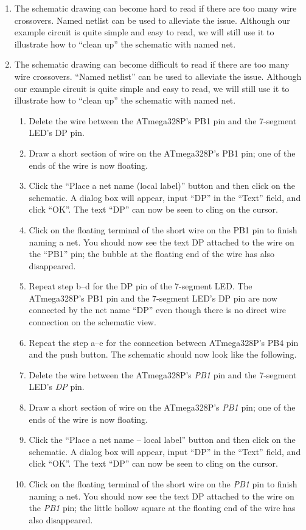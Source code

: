\documentclass[12pt,letterpaper]{scrartcl}
\begin{document}
\begin{enumerate}
	\item The schematic drawing can become hard to read if there are too many wire crossovers. Named netlist can be used to alleviate the issue. Although our example circuit is quite simple and easy to read, we will still use it to illustrate how to “clean up” the schematic with named net.
	\item The schematic drawing can become difficult to read if there are too many wire crossovers. ``Named netlist'' can be used to alleviate the issue. Although our example circuit is quite simple and easy to read, we will still use it to illustrate how to ``clean up'' the schematic with named net.
		\begin{enumerate}
			\item Delete the wire between the ATmega328P’s PB1 pin and the 7-segment LED’s DP pin.
			\item Draw a short section of wire on the ATmega328P’s PB1 pin; one of the ends of the wire is now floating. 
			\item Click the ``Place a net name (local label)'' button and then click on the schematic. A dialog box will appear, input ``DP'' in the ``Text'' field, and click ``OK''. The text ``DP'' can now be seen to cling on the cursor. 
			\item Click on the floating terminal of the short wire on the PB1 pin to finish naming a net. You should now see the text DP attached to the wire on the ``PB1'' pin; the bubble at the floating end of the wire has also disappeared. 
			\item Repeat step b--d for the DP pin of the 7-segment LED. 
			The ATmega328P’s PB1 pin and the 7-segment LED’s DP pin are now connected by the net name ``DP'' even though there is no direct wire connection on the schematic view. 
			\item Repeat the step a--e for the connection between ATmega328P’s PB4 pin and the push button. The schematic should now look like the following.  
			\item Delete the wire between the ATmega328P's \emph{PB1} pin and the 7-segment LED's \emph{DP} pin. 
			\item Draw a short section of wire on the ATmega328P's \emph{PB1} pin; one of the ends of the wire is now floating. 
			\item Click the ``Place a net name -- local label'' button and then click on the schematic. A dialog box will appear, input ``DP'' in the ``Text'' field, and click ``OK''. The text ``DP'' can now be seen to cling on the cursor. 
			\item Click on the floating terminal of the short wire on the \emph{PB1} pin to finish naming a net. You should now see the text DP attached to the wire on the \emph{PB1} pin; the little hollow square at the floating end of the wire has also disappeared. 

\end{enumerate}
\end{enumerate}
\end{document}
